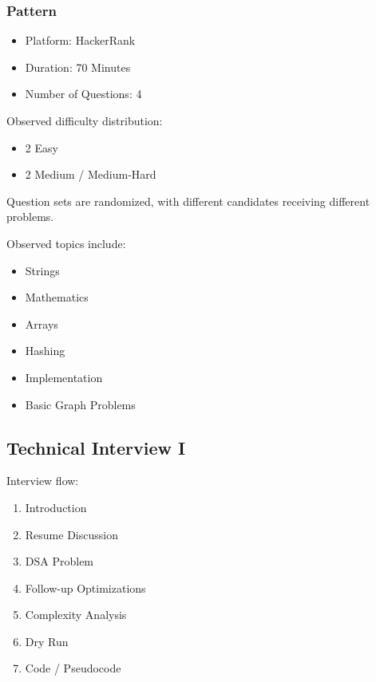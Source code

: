 \documentclass[11pt,a4paper]{article}
\begin{document}
\subsubsection{Pattern}

\begin{itemize}
	\item Platform: HackerRank
	\item Duration: 70 Minutes
	\item Number of Questions: 4
\end{itemize}

Observed difficulty distribution:

\begin{itemize}
	\item 2 Easy
	\item 2 Medium / Medium-Hard
\end{itemize}

Question sets are randomized, with different candidates receiving different problems.

Observed topics include:

\begin{itemize}
	\item Strings
	\item Mathematics
	\item Arrays
	\item Hashing
	\item Implementation
	\item Basic Graph Problems
\end{itemize}


\subsection{Technical Interview I}

Interview flow:

\begin{enumerate}
	\item Introduction
	\item Resume Discussion
	\item DSA Problem
	\item Follow-up Optimizations
	\item Complexity Analysis
	\item Dry Run
	\item Code / Pseudocode
\end{enumerate}
\end{document}
